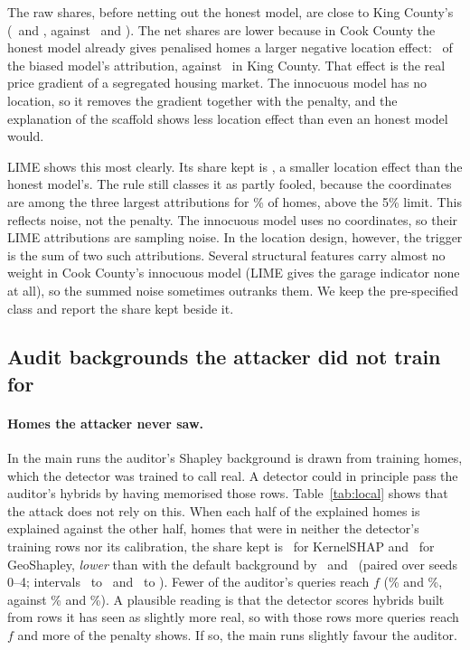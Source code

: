 The raw shares, before netting out the honest model, are close to King County's (\CookLKernelSHAPMatKeptRaw\ and
\CookLGeoShapleyMatKeptRaw, against \LKernelSHAPMatKeptRawFive\ and \LGeoShapleyMatKeptRawFive). The net shares are lower
because in Cook County the honest model already gives penalised homes a larger negative location effect:
\CookLKernelSHAPHonestKeptRaw\ of the biased model's attribution, against \LKernelSHAPHonestKeptRawFive\ in King County.
That effect is the real price gradient of a segregated housing market. The innocuous model has no location, so it
removes the gradient together with the penalty, and the explanation of the scaffold shows less location effect than
even an honest model would.

LIME shows this most clearly. Its share kept is \CookLLIMEMatKept, a smaller location effect than the honest model's.
The rule still classes it as partly fooled, because the coordinates are among the three largest attributions for
\CookLLIMEMatTop\% of homes, above the 5\% limit. This reflects noise, not the penalty. The innocuous model uses no
coordinates, so their LIME attributions are sampling noise. In the location design, however, the trigger is the sum
of two such attributions. Several structural features carry almost no weight in Cook County's innocuous model (LIME
gives the garage indicator none at all), so the summed noise sometimes outranks them. We keep the pre-specified class
and report the share kept beside it.


\subsection{Audit backgrounds the attacker did not train for}\label{sec:local}
\paragraph{Homes the attacker never saw.} In the main runs the auditor's Shapley background is drawn from training
homes, which the detector was trained to call real. A detector could in principle pass the auditor's hybrids by
having memorised those rows. Table~\ref{tab:local} shows that the attack does not rely on this. When each half of the
explained homes is explained against the other half, homes that were in neither the detector's training rows nor its
calibration, the share kept is \UnseenKernelSHAPKept\ for KernelSHAP and \UnseenGeoShapleyKept\ for GeoShapley,
\emph{lower} than with the default background by \UnseenKernelSHAPMinusMain\ and \UnseenGeoShapleyMinusMain\ (paired
over seeds 0--4; intervals \UnseenKernelSHAPMinusMainLo\ to \UnseenKernelSHAPMinusMainHi\ and
\UnseenGeoShapleyMinusMainLo\ to \UnseenGeoShapleyMinusMainHi). Fewer of the auditor's queries reach $f$
(\UnseenKernelSHAPLeak\% and \UnseenGeoShapleyLeak\%, against \MainKernelSHAPLeakLocalTab\% and \MainGeoShapleyLeakLocalTab\%). A
plausible reading is that the detector scores hybrids built from rows it has seen as slightly more real, so with
those rows more queries reach $f$ and more of the penalty shows. If so, the main runs slightly favour the auditor.

